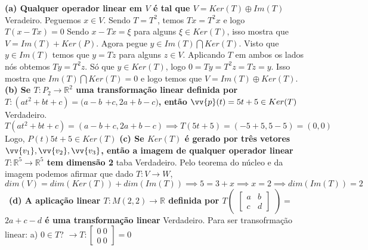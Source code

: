 \documentclass[11pt,a4paper]{article}
\newcommand\taba[1][2.55cm]{\hspace*{#1}}
\begin{document}
\begin{flushleft}
\taba \textbf{(a) Qualquer operador linear em $V$ é tal que $V = Ker(T) \oplus Im(T)$} \linebreak
\taba Veradeiro. Peguemos $x \in V$. Sendo $T = T^2$, temos $Tx = T^2x$ e logo $T(x-Tx) = 0$ \linebreak
\taba Sendo $x-Tx = \xi$ para alguns $\xi \in Ker(T)$, isso mostra que $V = Im(T) + Ker(P)$.
\taba Agora pegue $y \in Im(T) \bigcap Ker(T)$. Visto que $y \in Im(T)$ temos que $y = Tz$ para alguns $z \in V$. Aplicando $T$ em ambos os lados nós obtemos $Ty = T^2z$. Só que $y \in Ker(T)$,  logo $0 = Ty = T^2z = Tz = y$. Isso mostra que $Im(T) \bigcap Ker(T) = 0 $ e logo temos que $V = Im(T) \oplus Ker(T)$. \linebreak
\\
\taba \textbf{(b) Se $T:P_2\rightarrow\mathbb{R}^2$ uma transformação linear definida por $T:(at^2+bt+c) = (a-b$ $+c,  2a +b-c)$, então $\vv{p}(t)=5t+5 \in Ker(T)$} \linebreak
\taba Verdadeiro. $T(at^2+bt+c) = (a-b+c, 2a+b-c) \implies T(5t+5) = (-5+5,5-5) = (0,0)$ \linebreak
\taba Logo, $P(t) 5t+5 \in Ker(T)$ \linebreak \newline 
\taba \textbf{(c) Se $Ker(T)$ é gerado por três vetores $\vv{v_1}, \vv{v_2}, \vv{v_3}$, então a imagem de qualquer operador linear $T:\mathbb{R}^5\rightarrow\mathbb{R}^5$ tem dimensão 2}\linebreak
taba Verdadeiro. Pelo teorema do núcleo e da imagem podemos afirmar que dado $T: V \rightarrow W$, $dim(V) = dim(Ker(T)) + dim(Im(T)) \implies 5 = 3 +x \implies x = 2 \implies dim(Im(T)) = 2$ \linebreak
\newline \ \taba \textbf{(d) A aplicação linear $T:M(2,2)\rightarrow\mathbb{R}$ definida por $T\begin{pmatrix}\begin{bmatrix} a & b \\c & d\end{bmatrix}\end{pmatrix} = $ $2a+c-d$ é uma transformação linear}\linebreak 
\taba Verdadeiro. Para ser transofrmação linear:\linebreak 
\taba a) $0 \in T$?  $\rightarrow T: \begin{bmatrix} 0 \ 0 \\ 0 \ 0 \end{bmatrix} = 0$ \linebreak

\end{flushleft}
\end{document}
